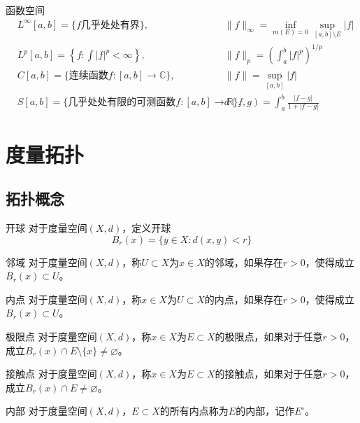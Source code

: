 \documentclass[lang = cn, scheme = chinese, thmcnt = section]{elegantbook}
\newcommand{\R}{\mathbb{R}}            %
\newcommand{\C}{\mathbb{C}}  		   %
\newcommand{\sub}{\subset}             %
\begin{document}
\begin{definition}{函数空间}
	\begin{align*}
		& L^\infty[a,b]=\{ f\text{几乎处处有界} \},&& \|f\|_\infty=\inf_{m(E)=0}\sup_{[a,b]\setminus E}|f|\\
		& L^p[a,b]=\left\{f:\int|f|^p<\infty\right\},&& \|f\|_p=\left(\int_a^b|f|^p\right)^{1/p}\\
		&C[a,b]=\{\text{连续函数}f:[a,b]\to\C\},&& \|f\|=\sup_{[a,b]}|f|\\
		&S[a,b]=\{\text{几乎处处有限的可测函数}f:[a,b]\to\R\},&& d(f,g)=\int_a^b\frac{|f-g|}{1+|f-g|}
	\end{align*}
\end{definition}

\section{度量拓扑}

\subsection{拓扑概念}

\begin{definition}{开球}
	对于度量空间$(X,d)$，定义开球
	$$
	B_r(x)=\{ y\in X:d(x,y)<r \}
	$$
\end{definition}

\begin{definition}{邻域}
	对于度量空间$(X,d)$，称$U\sub X$为$x\in X$的邻域，如果存在$r>0$，使得成立$B_r(x)\sub U$。
\end{definition}

\begin{definition}{内点}
	对于度量空间$(X,d)$，称$x\in X$为$U\sub X$的内点，如果存在$r>0$，使得成立$B_r(x)\sub U$。
\end{definition}

\begin{definition}{极限点}
	对于度量空间$(X,d)$，称$x\in X$为$E\sub X$的极限点，如果对于任意$r>0$，成立$B_r(x)\cap E\setminus\{ x \}\ne\varnothing$。
\end{definition}

\begin{definition}{接触点}
	对于度量空间$(X,d)$，称$x\in X$为$E\sub X$的接触点，如果对于任意$r>0$，成立$B_r(x)\cap E\ne\varnothing$。
\end{definition}

\begin{definition}{内部}
	对于度量空间$(X,d)$，$E\sub X$的所有内点称为$E$的内部，记作$E^\circ$。
\end{definition}
\end{document}
